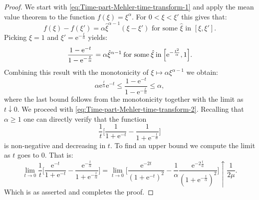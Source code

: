 \documentclass[a4paper,oneside,10pt]{amsproc}
\theoremstyle{remark}
\renewcommand{\leq}{\leqslant}
\renewcommand{\leq}{\leqslant}
\renewcommand{\geq}{\geqslant}
\newcommand{\e}{\mathrm{e}} %
\renewcommand{\leq}{\leqslant}%
\renewcommand{\geq}{\geqslant}%
\begin{document}
\begin{proof}
  We start with \eqref{eq:Time-part-Mehler-time-transform-1} and apply
  the mean value theorem to the function $f(\xi) = \xi^\alpha$. For $0
  < \xi < \xi'$ this gives that:
  \begin{equation*}
    f(\xi) - f(\xi') = \alpha \hat{\xi}^{\alpha - 1} (\xi - \xi')
    \text{ for some $\hat \xi$ in $[\xi, \xi']$}.
  \end{equation*}
  Picking $\xi = 1$ and $\xi' = \e^{-\frac{t}{\alpha}}$ yields:
  \begin{equation}
    \label{eq:Time-part-Mehler-time-transform-proof-1}
    \frac{1 - \e^{-t}}{1 - \e^{-\frac{t}{\alpha}}} = \alpha
    \hat{\xi}^{\alpha - 1} \:\text{for some}\: \hat{\xi} \:\text{in}\:
    \Bigl[\e^{-\frac{t^2}{\alpha}}, 1 \Bigr].
  \end{equation}
  Combining this result with the monotonicity of $\xi \mapsto
  \alpha \xi^{\alpha - 1}$ we obtain:
  \begin{equation*}
    \alpha \e^{\frac{t}{\alpha}} \e^{-t} \leq \frac{1 - \e^{-t}}{1 -
      \e^{-\frac{t}{\alpha}}} \leq \alpha,
  \end{equation*}
  where the last bound follows from the monotonicity together with the
  limit as $t \downarrow 0$.
  We proceed with \eqref{eq:Time-part-Mehler-time-transform-2}.
  Recalling that $\alpha \geq 1$ one can directly verify that the
  function
  \begin{equation*}
    \frac1t \biggl[\frac{1}{1 + \e^{-t}} - \frac{1}{1 +
      \e^{-\frac{t}{\alpha}}} \biggr]
  \end{equation*}
  is non-negative and decreasing in $t$. To find
  an upper bound we compute the limit as $t$ goes to $0$. That is:
  \begin{equation*}
    \lim_{t \to 0} \frac1t \biggl[\frac{\e^{-t}}{1 + \e^{-t}} -
    \frac{\e^{-\frac{t}\alpha}}{1 + \e^{-\frac{t}{\alpha}}} \biggr] 
    = \lim_{t \to 0} \biggl[\frac{\e^{-2t}}{(1 + \e^{-t})^2} -
    \frac1\alpha \frac{\e^{-2\frac{t}{\alpha}}}{(1 +
      \e^{-\frac{t}{\alpha}})^2} \biggr] \uparrow \frac{1}{2\mu}.
  \end{equation*}
  Which is as asserted and completes the proof.
\end{proof}
\end{document}
